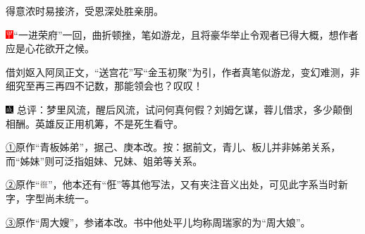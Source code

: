 得意浓时易接济，受恩深处胜亲朋。

{\includegraphics[width=3mm]{../Images/00002}``一进荣府''一回，曲折顿挫，笔如游龙，且将豪华举止令观者已得大概，想作者应是心花欲开之候。}

{借刘妪入阿凤正文，``送宫花''写``金玉初聚''为引，作者真笔似游龙，变幻难测，非细究至再三再四不记数，那能领会也？叹叹！}

{\includegraphics[width=3mm]{../Images/00005}  \kaishu 总评：梦里风流，醒后风流，试问何真何假？刘姆乞谋，蓉儿借求，多少颠倒相酬。英雄反正用机筹，不是死生看守。}


{\href{../Text/part0010_split_000.html\#navto_1_a}{①}原作``青板姊弟''，据己、庚本改。按：据前文，青儿、板儿并非姊弟关系，而``姊妹''则可泛指姐妹、兄妹、姐弟等关系。}

{\href{../Text/part0010_split_000.html\#navto_2_a}{②}原作``\includegraphics[width=3mm]{../images/00017}''，他本还有``俇''等其他写法，又有夹注音义出处，可见此字系当时新字，字型尚未统一。}

{\href{../Text/part0010_split_000.html\#navto_3_a}{③}原作``周大嫂''，参诸本改。书中他处平儿均称周瑞家的为``周大娘''。}
